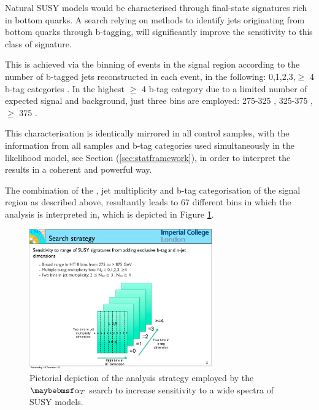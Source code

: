 \begin{itemize}
Natural \ac{SUSY} models would be characterised through final-state signatures rich in bottom quarks. A search relying on methods to identify jets originating from bottom quarks through b-tagging, will significantly improve the sensitivity to this class of signature. 

This is achieved via the binning of events in the signal region according to the number of b-tagged jets reconstructed in each event, in the following: 0,1,2,3,$\geq$ 4 b-tag categories . In the highest $\geq$ 4 b-tag category due to a limited number of expected signal and background, just three \theht bins are employed: 275-325 \GeV, 325-375 \GeV, $\geq$ 375 \GeV.

This characterisation is identically mirrored in all control samples, with the information from all samples and b-tag categories used simultaneously in the likelihood model, see Section (\ref{sec:statframework}), in order to interpret the results in a coherent and powerful way.

\end{itemize}
 
 The combination of the \theht, jet multiplicity and b-tag categorisation of the signal region as described above, resultantly leads to 67 different bins in which the analysis is interpreted in, which is depicted in Figure \ref{fig:analysisbinning}. 
 
 \begin{figure}[!h]
 \centering
\includegraphics[width=0.70\textwidth]{plots/analysis_binning.pdf}
\caption[Pictorial depiction of the analysis strategy employed by the $\alphat$ search to increase sensitivity to a wide spectra of \ac{SUSY} models.]{Pictorial depiction of the analysis strategy employed by the $\alphat$ search to increase sensitivity to a wide spectra of \ac{SUSY} models.}  
\label{fig:analysisbinning}
\end{figure}



